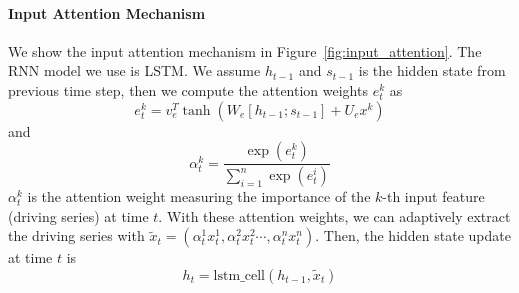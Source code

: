 \documentclass[11pt,a4paper]{article}
\begin{document}
\paragraph{Input Attention Mechanism}
We show the input attention mechanism in Figure~\ref{fig:input_attention}. The RNN model we use is LSTM. We assume $h_{t-1}$ and $s_{t-1}$ is the hidden state from previous time step, then we compute the attention weights $e_{t}^{k}$ as 
\begin{equation}
e_{t}^{k}=v_{e}^T\tanh (W_e[h_{t-1}; s_{t-1}]+U_ex^k)
\end{equation}
and
\begin{equation}
\alpha^{k}_{t}=\frac{\exp(e^{k}_{t})}{\sum_{i=1}^{n}\exp(e^{i}_{t})}
\end{equation}
$\alpha^{k}_{t}$ is the attention weight measuring the importance of the $k$-th input feature (driving series) at time $t$. With these attention weights, we can adaptively extract the driving series with $\tilde{x}_t=(\alpha^1_{t}x^1_{t}, \alpha^2_{t}x^2_{t}\cdots, \alpha^n_{t}x^n_{t})$. Then, the hidden state update at time $t$ is
\begin{equation}
h_t=\text{lstm\_cell}(h_{t-1}, \tilde{x}_t)
\end{equation}
\end{document}
